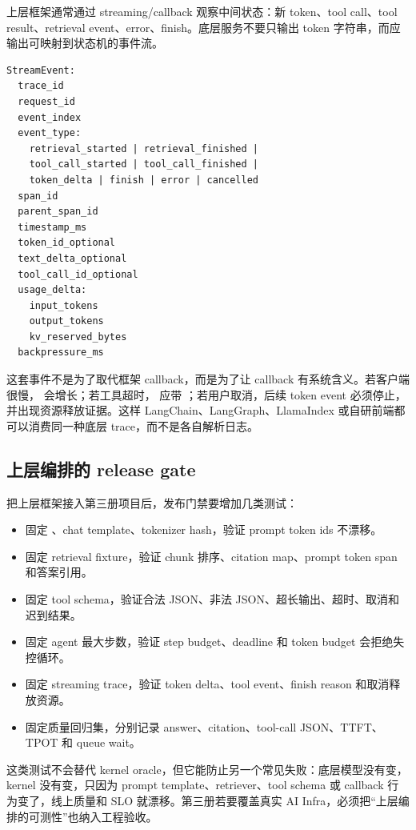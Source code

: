 上层框架通常通过 streaming/callback 观察中间状态：新 token、tool call、tool result、retrieval event、error、finish。底层服务不要只输出 token 字符串，而应输出可映射到状态机的事件流。

\begin{lstlisting}[numbers=none,caption={统一 streaming event schema}]
StreamEvent:
  trace_id
  request_id
  event_index
  event_type:
    retrieval_started | retrieval_finished |
    tool_call_started | tool_call_finished |
    token_delta | finish | error | cancelled
  span_id
  parent_span_id
  timestamp_ms
  token_id_optional
  text_delta_optional
  tool_call_id_optional
  usage_delta:
    input_tokens
    output_tokens
    kv_reserved_bytes
  backpressure_ms
\end{lstlisting}

这套事件不是为了取代框架 callback，而是为了让 callback 有系统含义。若客户端很慢， 会增长；若工具超时， 应带 ；若用户取消，后续 token event 必须停止，并出现资源释放证据。这样 LangChain、LangGraph、LlamaIndex 或自研前端都可以消费同一种底层 trace，而不是各自解析日志。

\subsection{上层编排的 release gate}

把上层框架接入第三册项目后，发布门禁要增加几类测试：

\begin{rubricbox}
\begin{itemize}
  \item 固定 、chat template、tokenizer hash，验证 prompt token ids 不漂移。
  \item 固定 retrieval fixture，验证 chunk 排序、citation map、prompt token span 和答案引用。
  \item 固定 tool schema，验证合法 JSON、非法 JSON、超长输出、超时、取消和迟到结果。
  \item 固定 agent 最大步数，验证 step budget、deadline 和 token budget 会拒绝失控循环。
  \item 固定 streaming trace，验证 token delta、tool event、finish reason 和取消释放资源。
  \item 固定质量回归集，分别记录 answer、citation、tool-call JSON、TTFT、TPOT 和 queue wait。
\end{itemize}
\end{rubricbox}

这类测试不会替代 kernel oracle，但它能防止另一个常见失败：底层模型没有变，kernel 没有变，只因为 prompt template、retriever、tool schema 或 callback 行为变了，线上质量和 SLO 就漂移。第三册若要覆盖真实 AI Infra，必须把“上层编排的可测性”也纳入工程验收。

